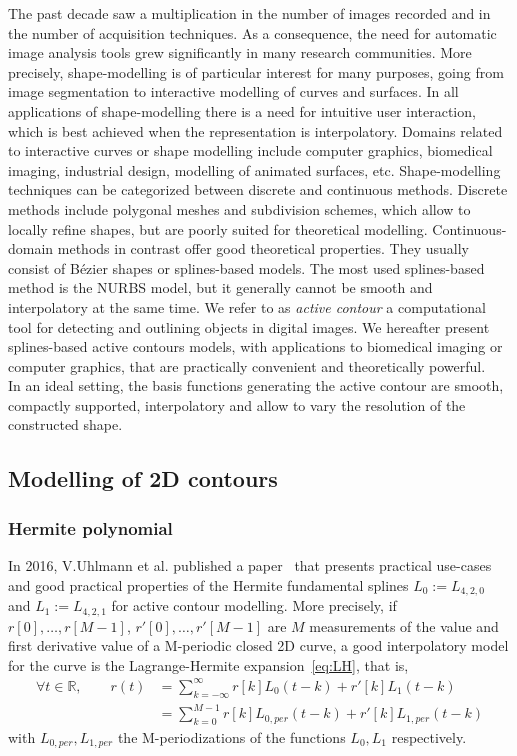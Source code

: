 The past decade saw a multiplication in the number of images recorded and in the number of acquisition techniques.  As a 
consequence, the need for automatic image analysis tools grew significantly in many research communities. More 
precisely, shape-modelling is of particular interest for many purposes, going from image segmentation to interactive 
modelling of curves and surfaces. In all applications of shape-modelling there is a need for intuitive user interaction, 
which is best achieved when the representation is interpolatory. Domains related to interactive curves or shape modelling 
include computer graphics, biomedical imaging, industrial design, modelling of animated surfaces, etc.  Shape-modelling 
techniques can be categorized between discrete and continuous methods.  Discrete methods include polygonal meshes and 
subdivision schemes, which allow to locally refine shapes, but are poorly suited for theoretical modelling.  
Continuous-domain methods in contrast offer good theoretical properties. They usually consist of Bézier shapes or 
splines-based models. The most used splines-based method is the NURBS model, but it generally cannot be smooth and 
interpolatory at the same time. We refer to as \emph{active contour} a computational tool for detecting and outlining 
objects in digital images.  We hereafter present splines-based active contours models, with applications to biomedical 
imaging or computer graphics, that are practically convenient and theoretically powerful. \\

In an ideal setting, the basis functions generating the active contour are smooth, compactly supported, interpolatory 
and allow to vary the resolution of the constructed shape.  

\subsection{Modelling of 2D contours}\label{ssec:2d}

\subsubsection{Hermite polynomial}

In 2016, V.Uhlmann et al\@. published a paper~\cite{uhlmann_hermite_2016} that presents practical use-cases and good 
practical properties of the Hermite fundamental splines $L_0 := L_{4,2,0}$ and $L_1 := L_{4,2,1}$ for active contour 
modelling.  More precisely, if $r[0], \ldots, r[M-1]$, $r'[0], \ldots, r'[M-1]$ are $M$ measurements of the value and 
first derivative value of a M-periodic closed 2D curve, a good interpolatory model for the curve is the Lagrange-Hermite 
expansion~\ref{eq:LH}, that is,
\begin{align*}
  \forall t \in \mathbb{R}, \qquad r(t) &= \sum_{k=-\infty}^{\infty} r[k] L_0(t-k) + r'[k] L_1(t-k) \\
  &= \sum_{k=0}^{M-1} r[k] L_{0,per}(t-k) + r'[k] L_{1,per}(t-k) \end{align*}
with $L_{0,per}, L_{1,per}$ the M-periodizations of the functions $L_0, L_1$ respectively.  

